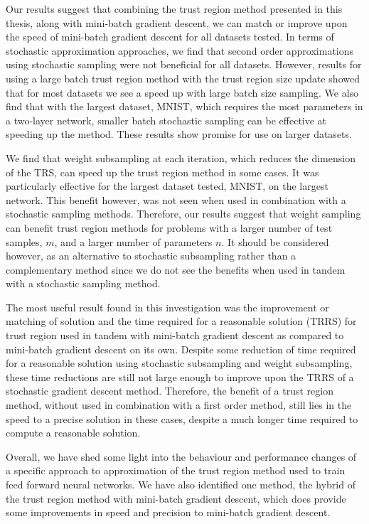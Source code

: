 \documentclass[letterpaper,12pt,titlepage,oneside,final]{book}
\begin{document}
	Our results suggest that combining the trust region method presented in this thesis, along with mini-batch gradient descent, we can match or improve upon the speed of mini-batch gradient descent for all datasets tested. In terms of stochastic approximation approaches, we find that second order approximations using stochastic sampling were not beneficial for all datasets. However, results for using a large batch trust region method with the trust region size update showed that for most datasets we see a speed up with large batch size sampling. We also find that with the largest dataset, MNIST, which requires the most parameters in a two-layer network, smaller batch stochastic sampling can be effective at speeding up the method. These results show promise for use on larger datasets.
	
	We find that weight subsampling at each iteration, which reduces the dimension of the TRS, can speed up the trust region method in some cases. It was particularly effective for the largest dataset tested, MNIST, on the largest network. This benefit however, was not seen when used in combination with a stochastic sampling methods. Therefore, our results suggest that weight sampling can benefit trust region methods for problems with a larger number of test samples, $m$, and a larger number of parameters $n$. It should be considered however, as an alternative to stochastic subsampling rather than a complementary method since we do not see the benefits when used in tandem with a stochastic sampling method.
	
	The most useful result found in this investigation was the improvement or matching of solution and the time required for a reasonable solution (TRRS) for trust region used in tandem with mini-batch gradient descent as compared to mini-batch gradient descent on its own. Despite some reduction of time required for a reasonable solution using stochastic subsampling and weight subsampling, these time reductions are still not large enough to improve upon the TRRS of a stochastic gradient descent method. Therefore, the benefit of a trust region method, without used in combination with a first order method, still lies in the speed to a precise solution in these cases, despite a much longer time required to compute a reasonable solution. 
	
	Overall, we have shed some light into the behaviour and performance changes of a specific approach to approximation of the trust region method used to train feed forward neural networks. We have also identified one method, the hybrid of the trust region method with mini-batch gradient descent, which does provide some improvements in speed and precision to mini-batch gradient descent.
	
\end{document}
